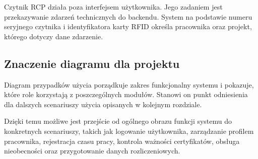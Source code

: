 Czytnik RCP działa poza interfejsem użytkownika. Jego zadaniem jest przekazywanie zdarzeń technicznych do backendu. System na podstawie numeru seryjnego czytnika i identyfikatora karty RFID określa pracownika oraz projekt, którego dotyczy dane zdarzenie.

\subsection{Znaczenie diagramu dla projektu}

Diagram przypadków użycia porządkuje zakres funkcjonalny systemu i pokazuje, które role korzystają z poszczególnych modułów. Stanowi on punkt odniesienia dla dalszych scenariuszy użycia opisanych w kolejnym rozdziale.

Dzięki temu możliwe jest przejście od ogólnego obrazu funkcji systemu do konkretnych scenariuszy, takich jak logowanie użytkownika, zarządzanie profilem pracownika, rejestracja czasu pracy, kontrola ważności certyfikatów, obsługa nieobecności oraz przygotowanie danych rozliczeniowych.